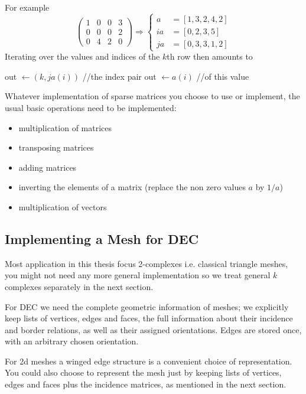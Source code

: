 For example 
\[\begin{pmatrix}
1 & 0 & 0 &3 \\
 0 & 0 & 0 &2 \\
 0 & 4&2&0
\end{pmatrix} \Rightarrow \begin{cases} a &= [1,3,2,4,2] \\ ia &= [0,2,3,5]  \\ ja &= [0,3,3,1,2]\end{cases}\]
Iterating over the values and indices of the $k$th row then amounts to
\begin{algorithmic}
	\STATE out $\gets (k,ja(i))$   //the index pair
	\STATE out $\gets a(i)$  //of this value
\ENDFOR
\end{algorithmic}

Whatever implementation of sparse matrices you choose to use or implement, the usual basic operations need to be implemented:
\begin{itemize}
\item multiplication of matrices
\item transposing matrices
\item adding matrices
\item inverting the elements of a matrix (replace the non zero values $a$ by $1/a$)
\item multiplication of vectors
\end{itemize}

\subsection{Implementing a Mesh for DEC}
\label{sec::2_handsOnSimplicialComplexes}
Most application in this thesis focus 2-complexes i.e. classical triangle meshes, you might not need any more general implementation so we treat general $k$ complexes separately in the next section. 

For DEC we need the complete geometric information of meshes; we explicitly keep lists of vertices, edges and faces, the full information about their incidence and border relations, as well as their assigned orientations. Edges are stored once, with an arbitrary chosen orientation.

For 2d meshes a winged edge structure is a convenient choice of representation. You could also choose to represent the mesh just by keeping lists of vertices, edges and faces plus the incidence matrices, as mentioned in the next section. 

